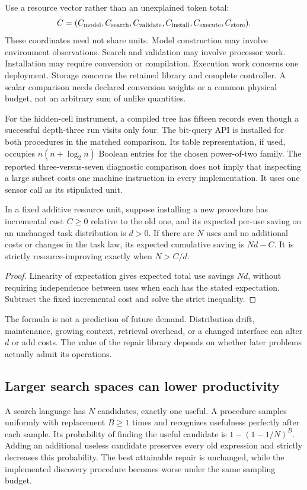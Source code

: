 Use a resource vector rather than an unexplained token total:
\[
C=(C_{\rm model},C_{\rm search},C_{\rm validate},C_{\rm install},
C_{\rm execute},C_{\rm store}).
\]
These coordinates need not share units. Model construction may involve environment observations. Search and validation may involve processor work. Installation may require conversion or compilation. Execution work concerns one deployment. Storage concerns the retained library and complete controller. A scalar comparison needs declared conversion weights or a common physical budget, not an arbitrary sum of unlike quantities.

For the hidden-cell instrument, a compiled tree has fifteen records even though a successful depth-three run visits only four. The bit-query API is installed for both procedures in the matched comparison. Its table representation, if used, occupies $n(n+\log_2n)$ Boolean entries for the chosen power-of-two family. The reported three-versus-seven diagnostic comparison does not imply that inspecting a large subset costs one machine instruction in every implementation. It uses one sensor call as its stipulated unit.

\begin{SIIproposition}\label{SII:prop:amortization}
In a fixed additive resource unit, suppose installing a new procedure has incremental cost $C\geq0$ relative to the old one, and its expected per-use saving on an unchanged task distribution is $d>0$. If there are $N$ uses and no additional costs or changes in the task law, its expected cumulative saving is $Nd-C$. It is strictly resource-improving exactly when $N>C/d$.
\end{SIIproposition}
\begin{proof}
Linearity of expectation gives expected total use savings $Nd$, without requiring independence between uses when each has the stated expectation. Subtract the fixed incremental cost and solve the strict inequality.
\end{proof}

The formula is not a prediction of future demand. Distribution drift, maintenance, growing context, retrieval overhead, or a changed interface can alter $d$ or add costs. The value of the repair library depends on whether later problems actually admit its operations.

\subsection{Larger search spaces can lower productivity}
\begin{SIIcounterexample}\label{SII:ex:dilution}
A search language has $N$ candidates, exactly one useful. A procedure samples uniformly with replacement $B\geq1$ times and recognizes usefulness perfectly after each sample. Its probability of finding the useful candidate is $1-(1-1/N)^B$. Adding an additional useless candidate preserves every old expression and strictly decreases this probability. The best attainable repair is unchanged, while the implemented discovery procedure becomes worse under the same sampling budget.
\end{SIIcounterexample}

